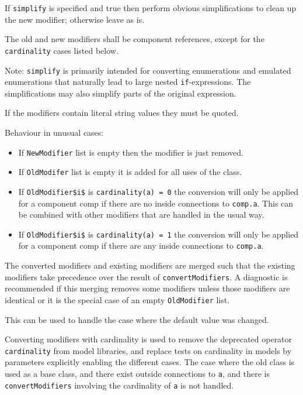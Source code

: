 If \lstinline!simplify! is specified and true then perform obvious simplifications to clean up the new modifier; otherwise leave as is.

The old and new modifiers shall be component references, except for the \lstinline!cardinality! cases listed below.

\begin{nonnormative}
Note: \lstinline!simplify! is primarily intended for converting enumerations and emulated enumerations that naturally lead to large nested \lstinline!if!-expressions.
The simplifications may also simplify parts of the original expression.
\end{nonnormative}

If the modifiers contain literal string values they must be quoted.

Behaviour in unusual cases:
\begin{itemize}
\item
  If \lstinline!NewModifier! list is empty then the modifier is just removed.
\item
  If \lstinline!OldModifer! list is empty it is added for all uses of the class.
\item
  If \lstinline!OldModifier$i$! is \lstinline!cardinality(a) = 0! the conversion will only be applied for a component comp if there are no inside connections to \lstinline!comp.a!.
  This can be combined with other modifiers that are handled in the usual way.
\item
  If \lstinline!OldModifier$i$! is \lstinline!cardinality(a) = 1! the conversion will only be applied for a component comp if there are any inside connections to \lstinline!comp.a!.
\end{itemize}

The converted modifiers and existing modifiers are merged such that the existing modifiers take precedence over the result of \lstinline!convertModifiers!.
A diagnostic is recommended if this merging removes some modifiers unless those modifiers are identical or it is the special case of an empty \lstinline!OldModifier! list.
\begin{nonnormative}
This can be used to handle the case where the default value was changed.
\end{nonnormative}

Converting modifiers with cardinality is used to remove the deprecated operator \lstinline!cardinality! from model libraries, and replace tests on cardinality in models by parameters explicitly enabling the different cases.
The case where the old class is used as a base class, and there exist outside connections to \lstinline!a!, and there is \lstinline!convertModifiers! involving the cardinality of \lstinline!a! is not handled.


